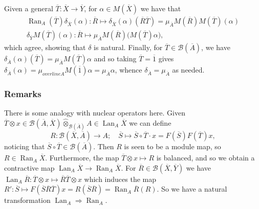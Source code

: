 \documentclass[a4paper,11pt]{article}
\theoremstyle{plain}
\theoremstyle{remark}
\newcommand{\mc}[1]{\mathcal{#1}}
\newcommand{\proten}{\widehat\otimes}
\newcommand{\lan}{\operatorname{Lan}}
\newcommand{\ran}{\operatorname{Ran}}
\begin{document}
Given a general $\overline T \colon \overline X \to \overline Y$, for $\alpha\in M(\overline X)$ we have that
\begin{gather*}
\ran_A(\overline T) \delta_{\overline X}(\alpha) \colon \overline R \mapsto \delta_{\overline X}(\alpha)(\overline R\overline T) = \mu_{\overline A} M(\overline R) M(\overline T)(\alpha) \\
\delta_{\overline Y} M(\overline T)(\alpha) \colon \overline R \mapsto \mu_{\overline A} M(\overline R)\big( M(\overline T)\alpha \big),
\end{gather*}
which agree, showing that $\delta$ is natural.  Finally, for $\overline T\in\mc B(\overline A)$, we have $\delta_{\overline A}(\alpha)(\overline T) = \mu_{\overline A} M(\overline T)\alpha$ and so taking $\overline T=\overline 1$ gives $\delta_{\overline A}(\alpha) = \mu_{overline A} M(\overline 1)\alpha = \mu_{\overline A}\alpha$, whence $\delta_{\overline A} = \mu_{\overline A}$ as needed.

\subsubsection{Remarks}

There is some analogy with nuclear operators here.  Given $\overline T\otimes x \in \mc B(\overline A, \overline X) \proten_{\mc B(\overline A)} A \in \lan_A \overline X$ we can define
\[ R \colon \mc B(\overline X,\overline A) \to A; \quad \overline S \mapsto \overline S\circ\overline T \cdot x = F(\overline S)F(\overline T) x, \]
noticing that $\overline S\circ\overline T \in \mc B(\overline A)$.  Then $R$ is seen to be a module map, so $R\in\ran_A\overline X$.  Furthermore, the map $\overline T\otimes x \mapsto R$ is balanced, and so we obtain a contractive map $\lan_A \overline X \to \ran_A \overline X$.  For $\overline R\in\mc B(\overline X, \overline Y)$ we have $\lan_A \overline R \colon \overline T\otimes x \mapsto \overline R\overline T\otimes x$ which induces the map $R' \colon \overline S \mapsto F(\overline S\overline R\overline T)x = R(\overline S\overline R) = \ran_A\overline R (R)$.  So we have a natural transformation $\lan_A \Rightarrow \ran_A$.







\end{document}
